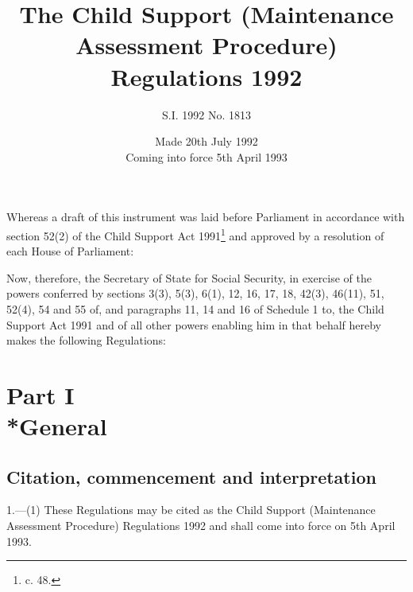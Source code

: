 \documentclass[a4paper]{article}
\title{The Child Support (Maintenance Assessment Procedure) Regulations 1992}
\author{S.I. 1992 No. 1813}
\date{Made 20th July 1992\\Coming into force 5th April 1993}
\newcommand{\parthead}{}
\begin{document}
\maketitle

\noindent
 Whereas a draft of this instrument was laid before Parliament in accordance with section 52(2) of the Child Support Act 1991\footnote{ c. 48.} and approved by a resolution of each House of Parliament:

 Now, therefore, the Secretary of State for Social Security, in exercise of the powers conferred by sections 3(3), 5(3), 6(1), 12, 16, 17, 18, 42(3), 46(11), 51, 52(4), 54 and 55 of, and paragraphs 11, 14 and 16 of Schedule 1 to, the Child Support Act 1991 and of all other powers enabling him in that behalf hereby makes the following Regulations:

{\sloppy

\tableofcontents

}

\setcounter{secnumdepth}{-2}

\section[Part I --- General]{Part I\\*General}

\renewcommand\parthead{--- Part I}

\subsection[1. Citation, commencement and interpretation]{Citation, commencement and interpretation}

1.—(1) These Regulations may be cited as the Child Support (Maintenance Assessment Procedure) Regulations 1992 and shall come into force on 5th April 1993.
\end{document}
